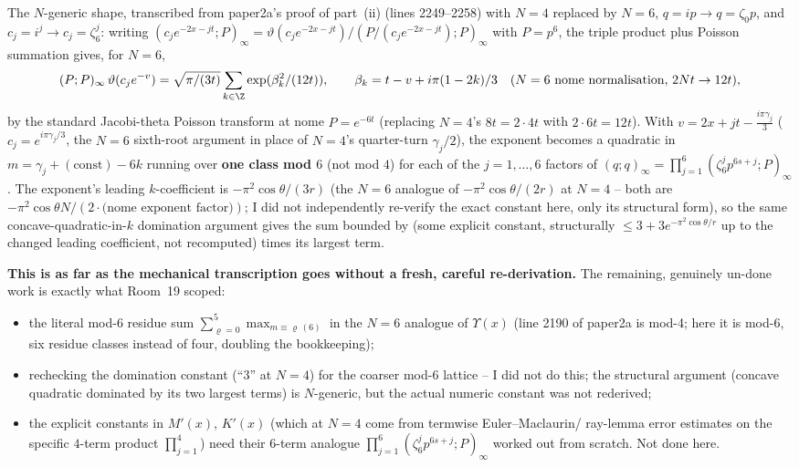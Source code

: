 \documentclass[11pt]{article}
\begin{document}
The $N$-generic shape, transcribed from paper2a's proof of part~(ii) (lines 2249--2258) with $N=4$
replaced by $N=6$, $q=ip\to q=\zeta_0p$, and $c_j=i^j\to c_j=\zeta_6^j$: writing
$(c_je^{-2x-jt};P)_\infty=\vartheta(c_je^{-2x-jt})/(P/(c_je^{-2x-jt});P)_\infty$ with $P=p^6$, the triple
product plus Poisson summation gives, for $N=6$,
\[
 (P;P)_\infty\,\vartheta(c_je^{-v})=\sqrt{\pi/(3t)}\sum_{k\in\Z}\exp(\beta_k^2/(12t)),\qquad
 \beta_k=t-v+i\pi(1-2k)/3\quad(\text{$N=6$ nome normalisation, }2Nt\to12t),
\]
by the standard Jacobi-theta Poisson transform at nome $P=e^{-6t}$ (replacing $N=4$'s $8t=2\cdot4t$ with
$2\cdot6t=12t$). With $v=2x+jt-\frac{i\pi\gamma_j}3$ ($c_j=e^{i\pi\gamma_j/3}$, the $N=6$ sixth-root
argument in place of $N=4$'s quarter-turn $\gamma_j/2$), the exponent becomes a quadratic in
$m=\gamma_j+(\text{const})-6k$ running over \textbf{one class mod $6$} (not mod $4$) for each of the
$j=1,\ldots,6$ factors of $(q;q)_\infty=\prod_{j=1}^6(\zeta_6^jp^{6s+j};P)_\infty$. The exponent's
leading $k$-coefficient is $-\pi^2\cos\theta/(3r)$ (the $N=6$ analogue of $-\pi^2\cos\theta/(2r)$ at
$N=4$ -- both are $-\pi^2\cos\theta N/(2\cdot\text{(nome exponent factor)})$; I did not independently
re-verify the exact constant here, only its structural form), so the same concave-quadratic-in-$k$
domination argument gives the sum bounded by (some explicit constant, structurally $\le3+3e^{-\pi^2\cos
\theta/r}$ up to the changed leading coefficient, not recomputed) times its largest term.

\textbf{This is as far as the mechanical transcription goes without a fresh, careful re-derivation.}
The remaining, genuinely un-done work is exactly what Room~19 scoped:
\begin{itemize}
\item the literal mod-$6$ residue sum $\sum_{\varrho=0}^{5}\max_{m\equiv\varrho\,(6)}$ in the $N=6$
analogue of $\Upsilon(x)$ (line 2190 of paper2a is mod-4; here it is mod-6, six residue classes instead
of four, doubling the bookkeeping);
\item rechecking the domination constant (``$3$'' at $N=4$) for the coarser mod-$6$ lattice -- I did
not do this; the structural argument (concave quadratic dominated by its two largest terms) is
$N$-generic, but the actual numeric constant was not rederived;
\item the explicit constants in $M'(x)$, $K'(x)$ (which at $N=4$ come from termwise Euler--Maclaurin/
ray-lemma error estimates on the specific $4$-term product $\prod_{j=1}^4$) need their $6$-term analogue
$\prod_{j=1}^6(\zeta_6^jp^{6s+j};P)_\infty$ worked out from scratch. Not done here.
\end{itemize}
\end{document}

